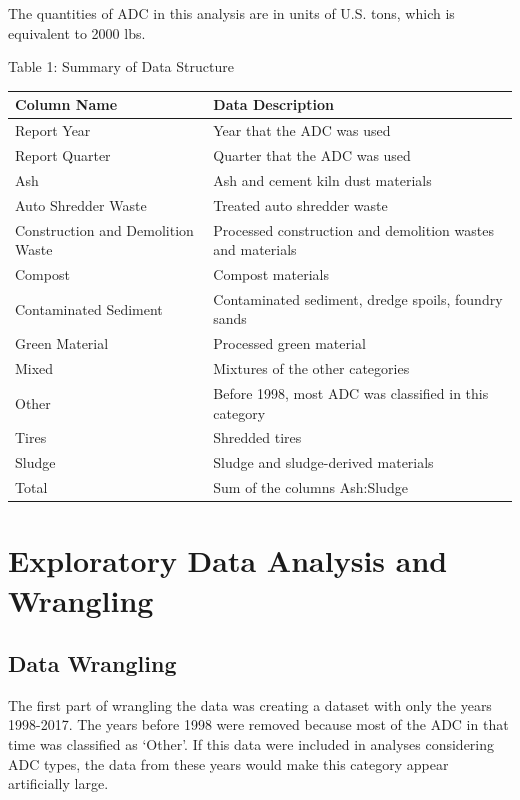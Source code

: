 \documentclass[12pt,]{article}
\begin{document}
The quantities of ADC in this analysis are in units of U.S. tons, which
is equivalent to 2000 lbs.

Table 1: Summary of Data Structure

\begin{table}[H]
\centering
\begin{tabular}{l|l}
\hline
\textbf{Column Name} & \textbf{Data Description}\\
\hline
Report Year & Year that the ADC was used\\
\hline
Report Quarter & Quarter that the ADC was used\\
\hline
Ash & Ash and cement kiln dust materials\\
\hline
Auto Shredder Waste & Treated auto shredder waste\\
\hline
Construction and Demolition Waste & Processed construction and demolition wastes and materials\\
\hline
Compost & Compost materials\\
\hline
Contaminated Sediment & Contaminated sediment, dredge spoils, foundry sands\\
\hline
Green Material & Processed green material\\
\hline
Mixed & Mixtures of the other categories\\
\hline
Other & Before 1998, most ADC was classified in this category\\
\hline
Tires & Shredded tires\\
\hline
Sludge & Sludge and sludge-derived materials\\
\hline
Total & Sum of the columns Ash:Sludge\\
\hline
\end{tabular}
\end{table}

\newpage

\section{Exploratory Data Analysis and
Wrangling}\label{exploratory-data-analysis-and-wrangling}

\subsection{Data Wrangling}\label{data-wrangling}

The first part of wrangling the data was creating a dataset with only
the years 1998-2017. The years before 1998 were removed because most of
the ADC in that time was classified as `Other'. If this data were
included in analyses considering ADC types, the data from these years
would make this category appear artificially large.
\end{document}
